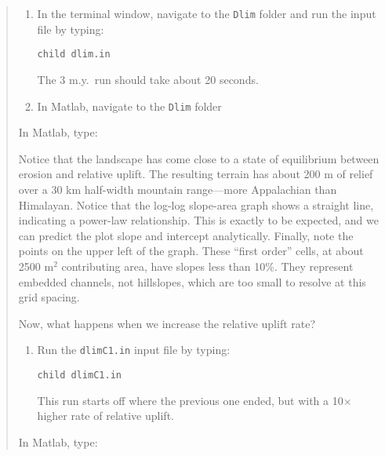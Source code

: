 \documentclass[12pt,reqno]{amsart}
\begin{document}
\begin{quote}
\small
{\sf
\begin{enumerate}
\item
In the terminal window, navigate to the {\tt Dlim} folder and run the
input file by typing:

{\tt child dlim.in}

The 3 m.y.\ run should take about 20 seconds.
\item
In Matlab, navigate to the {\tt Dlim} folder
\end{enumerate}

In Matlab, type:

\noindent
Notice that the landscape has come close to a state of equilibrium
between erosion and relative uplift. The resulting terrain has about
200 m of relief over a 30 km half-width mountain range---more
Appalachian than Himalayan. Notice that the log-log slope-area graph
shows a straight line, indicating a power-law relationship. This is
exactly to be expected, and we can predict the plot slope and
intercept analytically. Finally, note the points on the upper left of
the graph. These ``first order'' cells, at about 2500 m$^2$
contributing area, have slopes less than 10\%. They represent embedded
channels, not hillslopes, which are too small to resolve at this grid
spacing.

Now, what happens when we increase the relative uplift rate?

\begin{enumerate}
\item
Run the {\tt dlimC1.in} input file by typing:

{\tt child dlimC1.in}

This run starts off where the previous one ended, but with a 10$\times$ higher rate of relative uplift.
\end{enumerate}

In Matlab, type:

}
\end{quote}
\end{document}
